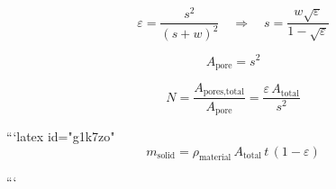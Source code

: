\[
\varepsilon = \frac{s^2}{(s + w)^2} \quad \Rightarrow \quad s = \frac{w \sqrt{\varepsilon}}{1 - \sqrt{\varepsilon}}
\]

\[
A_{\text{pore}} = s^2
\]

\[
N = \frac{A_{\text{pores,total}}}{A_{\text{pore}}} = \frac{\varepsilon \, A_{\text{total}}}{s^2}
\]


```latex id="g1k7zo"
\[
m_{\text{solid}} = \rho_{\text{material}} \, A_{\text{total}} \, t \, (1 - \varepsilon)
\]

```


